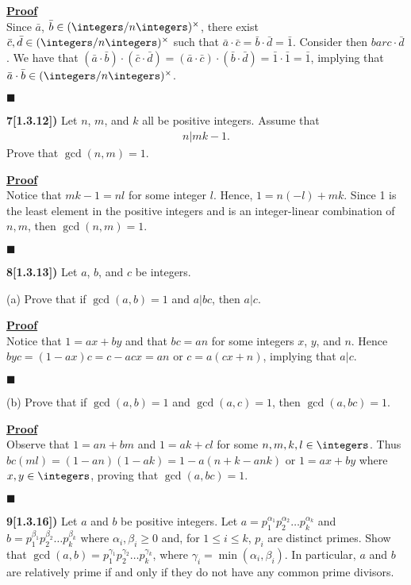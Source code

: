 \documentclass[12pt,a4paper]{article}
\newcommand{\prob}[2]{\textbf{#1)} #2}
\newenvironment{proof}
{
\textbf{\underline{Proof}} \\
}
{
\begin{flushright}
$\blacksquare$
\end{flushright}}
\begin{document}
\begin{proof}
Since $\bar{a}$, $\bar{b} \in (\integers/n\integers)^{\times}$, there exist $\bar{c},\bar{d} \in (\integers/n\integers)^{\times}$ such that $\bar{a} \cdot \bar{c} = \bar{b} \cdot \bar{d} = \bar{1}$. Consider then $bar{c} \cdot \bar{d}$. We have that $(\bar{a} \cdot \bar{b}) \cdot (\bar{c} \cdot \bar{d}) = (\bar{a} \cdot \bar{c}) \cdot (\bar{b} \cdot \bar{d}) = \bar{1} \cdot \bar{1} = \bar{1}$, implying that $\bar{a} \cdot \bar{b} \in (\integers/n\integers)^{\times}$.
\end{proof}

\prob{7[1.3.12]}{Let $n$, $m$, and $k$ all be positive integers. Assume that 
\begin{align*}
n | mk-1.
\end{align*}
Prove that $\gcd(n,m) = 1$.}

\begin{proof}
Notice that $ mk-1 = nl$ for some integer $l$. Hence, $1 = n(-l) + mk$. Since 1 is the least element in the positive integers and is an integer-linear combination of $n,m$, then $\gcd(n,m) = 1$.
\end{proof}

\prob{8[1.3.13]}{Let $a$, $b$, and $c$ be integers.}

(a) Prove that if $\gcd(a,b) = 1$ and $a|bc$, then $a|c$.

\begin{proof}
Notice that $1 = ax+by$ and that $bc = an$ for some integers $x$, $y$, and $n$. Hence $byc = (1 - ax)c = c - acx = an$ or $c = a(cx + n)$, implying that $a|c$.
\end{proof}

(b) Prove that if $\gcd(a,b) = 1$ and $\gcd(a,c) = 1$, then $\gcd(a,bc) = 1$.

\begin{proof}
Observe that $1 = an + bm$ and $1 = ak + cl$ for some $n,m,k,l \in \integers$. Thus $bc(ml) = (1-an)(1-ak) = 1 - a(n + k - ank)$ or $1 = ax + by$ where $x,y \in \integers$, proving that $\gcd(a,bc) = 1$.
\end{proof}

\prob{9[1.3.16]}{Let $a$ and $b$ be positive integers. Let $a = p_1^{\alpha_1}p_2^{\alpha_2} \hdots p_k^{\alpha_k}$ and $b = p_1^{\beta_1}p_2^{\beta_2}\hdots p_k^{\beta_k}$ where $\alpha_i,\beta_i \geq 0$ and, for $1 \leq i \leq k$, $p_i$ are distinct primes. Show that $\gcd(a,b) = p_1^{\gamma_1}p_2^{\gamma_2}\hdots p_k^{\gamma_k}$, where $\gamma_i = \min(\alpha_i,\beta_i)$. In particular, $a$ and $b$ are relatively prime if and only if they do not have any common prime divisors.}
\end{document}
